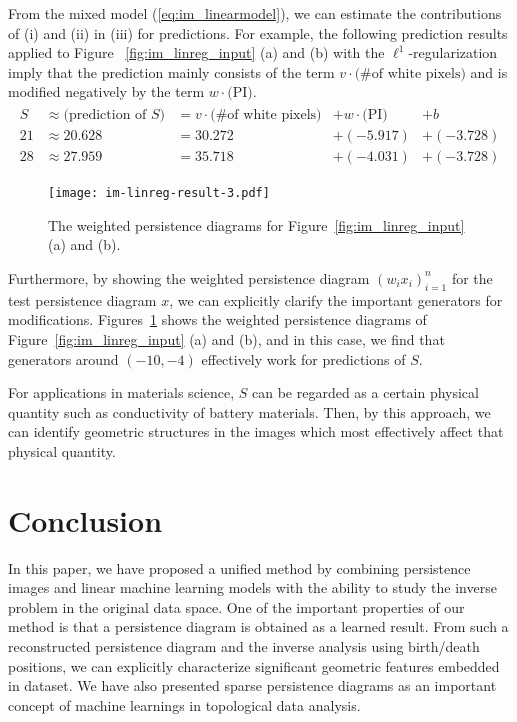\documentclass[smallextended]{svjour3}
\begin{document}
From the mixed model (\ref{eq:im_linearmodel}), we can estimate the contributions of (i) and (ii) in (iii) for predictions. For example, the following prediction results applied to Figure ~\ref{fig:im_linreg_input} (a) and (b) with the $\ell^1$-regularization imply that the prediction mainly consists of
the term $v\cdot\textrm{(\# of white pixels)}$ and is modified negatively by
the term $w \cdot \textrm{(PI)}$. 
\begin{align*}
  \begin{array}{lllll}
    S & \approx
        \mbox{(prediction of $S$)} & = v\cdot\textrm{(\# of white pixels)} &+ w \cdot \textrm{(PI)} &+  b  \\
    21 &\approx 20.628 &= 30.272 &+  (-5.917) &+  (-3.728) \\
    28 &\approx 27.959 &= 35.718 &+  (-4.031) &+  (-3.728)   
  \end{array}
\end{align*}

\begin{figure}[htbp]
  \centering
  \texttt{[image: im-linreg-result-3.pdf]}
  \caption{The weighted persistence diagrams for
    Figure~\ref{fig:im_linreg_input} (a) and (b).}
  \label{fig:im_lasso_weights}
\end{figure}


Furthermore, by showing the weighted persistence diagram $(w_ix_i)_{i=1}^{n}$ for the test persistence diagram $x$, we can explicitly clarify the important generators for modifications. 
Figures~\ref{fig:im_lasso_weights}  shows the weighted persistence diagrams of Figure~\ref{fig:im_linreg_input} (a) and (b), and in this case, we find that generators around $(-10, -4)$ effectively work for predictions of $S$.

For applications in materials science, $S$ can be regarded as a certain physical quantity such as conductivity of battery materials. Then, by this approach, we can identify  geometric structures in the images which most effectively affect that physical quantity. 

\section{Conclusion}\label{sec:conclusion}
In this paper, we have proposed a unified method by combining persistence images and linear machine learning models with the ability to study the inverse problem in the original data space. One of the important properties of our method is that a persistence diagram is obtained as a learned result. From such a reconstructed persistence diagram and the inverse analysis using birth/death positions, we can explicitly characterize significant  geometric features embedded in dataset. We have also presented sparse persistence diagrams as an important concept of machine learnings in topological data analysis. 
\end{document}
